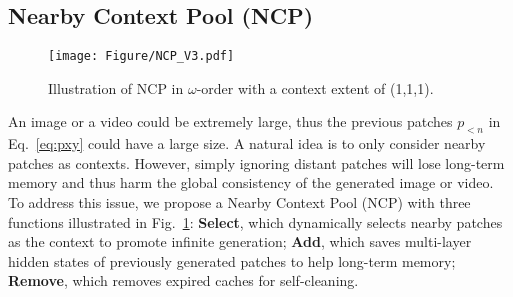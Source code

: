 \documentclass{article}
\begin{document}
\subsection{Nearby Context Pool (NCP)}\label{sec:ncp}

\begin{figure}[htbp]
    \centering
    \texttt{[image: Figure/NCP\_V3.pdf]}
    \caption{Illustration of NCP in $\omega$-order with a context extent of (1,1,1). 
    }
\label{fig:ncp_demo}
\end{figure}

An image or a video could be extremely large, thus the previous patches $p_{<n}$ in Eq.~\ref{eq:pxy} could have a large size. A natural idea is to only consider nearby patches as contexts. However, simply ignoring distant patches will lose long-term memory and thus harm the global consistency of the generated image or video. 
To address this issue, we propose a Nearby Context Pool (NCP) with three functions illustrated in Fig.~\ref{fig:ncp_demo}: 
\textbf{Select}, which dynamically selects nearby patches as the context to promote infinite generation; 
\textbf{Add}, which saves multi-layer hidden states of previously generated patches to help long-term memory; 
\textbf{Remove}, which removes expired caches for self-cleaning.
\end{document}
